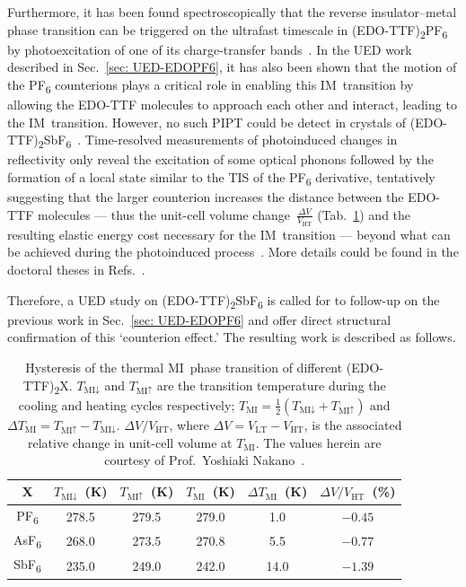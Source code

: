 Furthermore, it has been found spectroscopically that
the reverse insulator--metal phase transition can be triggered on the ultrafast timescale
in (EDO-TTF)\textsubscript{2}PF\textsubscript{6} by photoexcitation of
one of its charge-transfer bands~\cite{Chollet2004, Onda2008, Fukazawa2012}.
%
In the UED work described in Sec.~\ref{sec: UED-EDOPF6},
it has also been shown that the motion of the PF\textsubscript{6} counterions
plays a critical role in enabling this IM~transition by allowing the EDO-TTF molecules
to approach each other and interact, leading to the IM~transition.
%
However, no such PIPT could be detect in crystals of
(EDO-TTF)\textsubscript{2}SbF\textsubscript{6}~\cite{Lorenc2008, Servol2015}.
Time-resolved measurements of photoinduced changes in reflectivity only reveal
the excitation of some optical phonons followed by the formation of a local state
similar to the TIS of the PF\textsubscript{6} derivative, tentatively suggesting
that the larger counterion increases the distance between the EDO-TTF molecules
--- thus the unit-cell volume change~$\frac{\Delta V}{V_\text{HT}}$ (Tab.~\ref{tab: EDO-TMI})
and the resulting elastic energy cost necessary for the IM~transition ---
beyond what can be achieved during the photoinduced process~\cite{Servol2015}.
More details could be found in the doctoral theses in Refs.~\cite{Moisan-thesis, Kaszub-thesis}.

Therefore, a UED study on (EDO-TTF)\textsubscript{2}SbF\textsubscript{6} is called for
to follow-up on the previous work in Sec.~\ref{sec: UED-EDOPF6} and
offer direct structural confirmation of this `counterion effect.'
The resulting work is described as follows.

\begin{table}[ht!]
  \centering
    \begin{tabular}{c c c c c c}
      \toprule
      X & $T_{\text{MI}\downarrow}$~(K) & $T_{\text{MI}\uparrow}$~(K) & $T_\text{MI}$~(K) & $\Delta T_\text{MI}$~(K) & $\Delta V / V_\text{HT}$~(\%) \\
      \midrule
      PF\textsubscript{6}  & 278.5 & 279.5 & 279.0 & 1.0  & $-0.45$ \\
      AsF\textsubscript{6} & 268.0 & 273.5 & 270.8 & 5.5  & $-0.77$ \\
      SbF\textsubscript{6} & 235.0 & 249.0 & 242.0 & 14.0 & $-1.39$ \\
      \bottomrule
    \end{tabular}
  \caption{Hysteresis of the thermal MI~phase transition of different (EDO-TTF)\textsubscript{2}X.
    $T_{\text{MI}\downarrow}$ and $T_{\text{MI}\uparrow}$ are the transition temperature
    during the cooling and heating cycles respectively;
    $T_\text{MI} = \frac{1}{2} (T_{\text{MI}\downarrow} + T_{\text{MI}\uparrow})$ and
    $\Delta T_\text{MI} = T_{\text{MI}\uparrow} - T_{\text{MI}\downarrow}$.
    $\Delta V / V_\text{HT}$, where $\Delta V = V_\text{LT} - V_\text{HT}$,
    is the associated relative change in unit-cell volume at $T_\text{MI}$.
    The values herein are courtesy of Prof.~Yoshiaki Nakano~\cite{Nakano2008, NakanoX}.}
  \label{tab: EDO-TMI}
\end{table}


